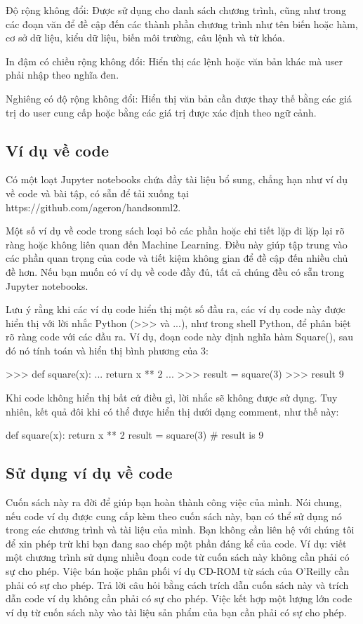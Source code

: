 Độ rộng không đổi: Được sử dụng cho danh sách chương trình, cũng như trong các đoạn văn để đề cập đến các thành phần chương trình như tên biến hoặc hàm, cơ sở dữ liệu, kiểu dữ liệu, biến môi trường, câu lệnh và từ khóa.

In đậm có chiều rộng không đổi: Hiển thị các lệnh hoặc văn bản khác mà user phải nhập theo nghĩa đen.

Nghiêng có độ rộng không đổi: Hiển thị văn bản cần được thay thế bằng các giá trị do user cung cấp hoặc bằng các giá trị được xác định theo ngữ cảnh.

\subsection{Ví dụ về code}

Có một loạt Jupyter notebooks chứa đầy tài liệu bổ sung, chẳng hạn như ví dụ về code và bài tập, có sẵn để tải xuống tại https://github.com/ageron/handsonml2.

Một số ví dụ về code trong sách loại bỏ các phần hoặc chi tiết lặp đi lặp lại rõ ràng hoặc không liên quan đến Machine Learning. Điều này giúp tập trung vào các phần quan trọng của code và tiết kiệm không gian để đề cập đến nhiều chủ đề hơn. Nếu bạn muốn có ví dụ về code đầy đủ, tất cả chúng đều có sẵn trong Jupyter notebooks.

Lưu ý rằng khi các ví dụ code hiển thị một số đầu ra, các ví dụ code này được hiển thị với lời nhắc Python (>>> và ...), như trong shell Python, để phân biệt rõ ràng code với các đầu ra. Ví dụ, đoạn code này định nghĩa hàm Square(), sau đó nó tính toán và hiển thị bình phương của 3:

>>> def square(x): ... return x ** 2 ... >>> result = square(3) >>> result 9

Khi code không hiển thị bất cứ điều gì, lời nhắc sẽ không được sử dụng. Tuy nhiên, kết quả đôi khi có thể được hiển thị dưới dạng comment, như thế này:

def square(x): return x ** 2 result = square(3) \# result is 9

\subsection{Sử dụng ví dụ về code}

Cuốn sách này ra đời để giúp bạn hoàn thành công việc của mình. Nói chung, nếu code ví dụ được cung cấp kèm theo cuốn sách này, bạn có thể sử dụng nó trong các chương trình và tài liệu của mình. Bạn không cần liên hệ với chúng tôi để xin phép trừ khi bạn đang sao chép một phần đáng kể của code. Ví dụ: viết một chương trình sử dụng nhiều đoạn code từ cuốn sách này không cần phải có sự cho phép. Việc bán hoặc phân phối ví dụ CD-ROM từ sách của O'Reilly cần phải có sự cho phép. Trả lời câu hỏi bằng cách trích dẫn cuốn sách này và trích dẫn code ví dụ không cần phải có sự cho phép. Việc kết hợp một lượng lớn code ví dụ từ cuốn sách này vào tài liệu sản phẩm của bạn cần phải có sự cho phép.

